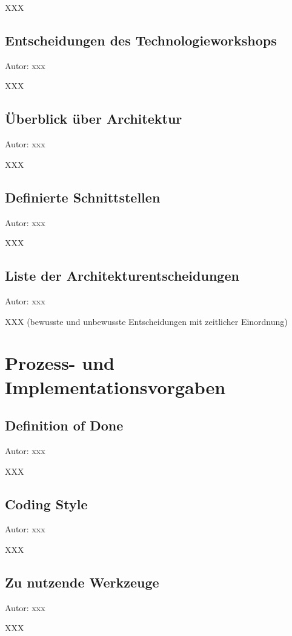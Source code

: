 \documentclass[twoside]{report}
\begin{document}
XXX

\subsection{Entscheidungen des Technologieworkshops}
{\small Autor: xxx}

XXX

\subsection{Überblick über Architektur}
{\small Autor: xxx}

XXX

\subsection{Definierte Schnittstellen}
{\small Autor: xxx}

XXX

\subsection{Liste der Architekturentscheidungen}
{\small Autor: xxx}

XXX (bewusste und unbewusste Entscheidungen mit zeitlicher Einordnung)



\section{Prozess- und Implementationsvorgaben}

\subsection{Definition of Done}
{\small Autor: xxx}

XXX

\subsection{Coding Style}
{\small Autor: xxx}

XXX

\subsection{Zu nutzende Werkzeuge}
{\small Autor: xxx}

XXX


\end{document}
